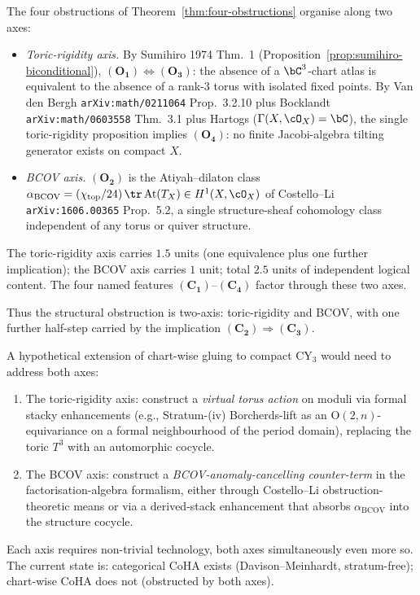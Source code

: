 \begin{proposition}
\label{prop:structural-content}
The four obstructions of Theorem~\ref{thm:four-obstructions} organise
along two axes:
\begin{itemize}[leftmargin=2em]
\item \emph{Toric-rigidity axis.} By Sumihiro 1974 Thm.~1
 (Proposition~\ref{prop:sumihiro-biconditional}),
 $(\mathbf{O_1}) \Leftrightarrow (\mathbf{O_3})$: the absence of a
 $\bC^3$-chart atlas is equivalent to the absence of a rank-$3$ torus
 with isolated fixed points. By Van den Bergh
 \texttt{arXiv:math/0211064} Prop.~3.2.10 plus Bocklandt
 \texttt{arXiv:math/0603558} Thm.~3.1 plus Hartogs
 ($\Gamma(X,\cO_X) = \bC$), the single toric-rigidity proposition
 implies $(\mathbf{O_4})$: no finite Jacobi-algebra tilting generator
 exists on compact $X$.
\item \emph{BCOV axis.} $(\mathbf{O_2})$ is the Atiyah--dilaton
 class $\alpha_{\mathrm{BCOV}}=(\chi_{\mathrm{top}}/24)\,\tr\,
 \mathrm{At}(T_X)\in H^1(X,\cO_X)$ of Costello--Li
 \texttt{arXiv:1606.00365} Prop.~5.2, a single structure-sheaf
 cohomology class independent of any torus or quiver structure.
\end{itemize}
The toric-rigidity axis carries $1.5$ units (one equivalence plus one
further implication); the BCOV axis carries $1$ unit; total $2.5$
units of independent logical content. The four named features
$(\mathbf{C_1})$--$(\mathbf{C_4})$ factor through these two axes.
\end{proposition}

Thus the structural obstruction is two-axis: toric-rigidity and BCOV,
with one further half-step carried by the implication
\((\mathbf{C_2})\Rightarrow(\mathbf{C_3})\).

\begin{remark}
\label{rem:extension-sketch}
A hypothetical extension of chart-wise gluing to compact CY$_3$ would
need to address both axes:
\begin{enumerate}[leftmargin=2em]
\item The toric-rigidity axis: construct a \emph{virtual torus action}
 on moduli via formal stacky enhancements (e.g., Stratum-(iv)
 Borcherds-lift as an $\mathrm{O}(2, n)$-equivariance on a formal
 neighbourhood of the period domain), replacing the toric $T^3$ with
 an automorphic cocycle.
\item The BCOV axis: construct a \emph{BCOV-anomaly-cancelling counter-term}
 in the factorisation-algebra formalism, either through Costello--Li
 obstruction-theoretic means or via a derived-stack enhancement that
 absorbs $\alpha_{\mathrm{BCOV}}$ into the structure cocycle.
\end{enumerate}
Each axis requires non-trivial technology, both axes simultaneously
even more so. The current state is: categorical CoHA exists
(Davison--Meinhardt, stratum-free); chart-wise CoHA does not (obstructed
by both axes).
\end{remark}

